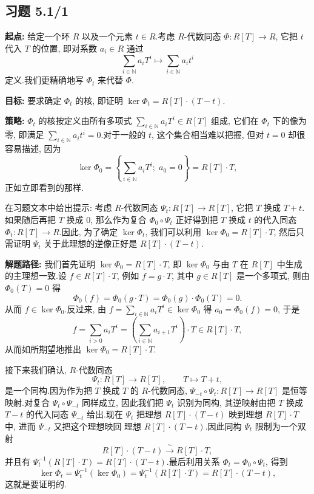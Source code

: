\subsection*{习题 5.1/1}

\noindent\textbf{起点:} 给定一个环 $R$ 以及一个元素 $t \in R$.考虑 $R$-代数同态
$\Phi \colon R[T] \longrightarrow R$, 它把 $t$ 代入 $T$ 的位置, 即对系数
$a_i \in R$ 通过
\[
\sum_{i \in \mathbb{N}} a_i T^i \longmapsto \sum_{i \in \mathbb{N}} a_i t^i
\]
定义.我们更精确地写 $\Phi_t$ 来代替 $\Phi$.

\noindent\textbf{目标:} 要求确定 $\Phi_t$ 的核, 即证明
$\ker \Phi_t = R[T] \cdot (T - t)$.

\noindent\textbf{策略:} $\Phi_t$ 的核按定义由所有多项式
$\sum_{i \in \mathbb{N}} a_i T^i \in R[T]$ 组成, 它们在 $\Phi_t$ 下的像为零, 即满足
$\sum_{i \in \mathbb{N}} a_i t^i = 0$.对于一般的 $t$, 这个集合相当难以把握, 但对
$t = 0$ 却很容易描述, 因为
\[
\ker \Phi_0 = \left\{ \sum_{i \in \mathbb{N}} a_i T^i;\; a_0 = 0 \right\} = R[T] \cdot T,
\]
正如立即看到的那样.

在习题文本中给出提示: 考虑 $R$-代数同态 $\Psi_t \colon R[T] \longrightarrow R[T]$,
它把 $T$ 换成 $T + t$.如果随后再把 $T$ 换成 $0$, 那么作为复合
$\Phi_0 \circ \Psi_t$ 正好得到把 $T$ 换成 $t$ 的代入同态
$\Phi_t \colon R[T] \longrightarrow R$.因此, 为了确定 $\ker \Phi_t$, 我们可以利用
$\ker \Phi_0 = R[T] \cdot T$, 然后只需证明 $\Psi_t$ 关于此理想的逆像正好是
$R[T] \cdot (T - t)$.

\noindent\textbf{解题路径:} 我们首先证明 $\ker \Phi_0 = R[T] \cdot T$, 即
$\ker \Phi_0$ 与由 $T$ 在 $R[T]$ 中生成的主理想一致.设 $f \in R[T] \cdot T$, 例如
$f = g \cdot T$, 其中 $g \in R[T]$ 是一个多项式, 则由 $\Phi_0(T) = 0$ 得
\[
\Phi_0(f) = \Phi_0(g \cdot T) = \Phi_0(g) \cdot \Phi_0(T) = 0\text{.}
\]
从而 $f \in \ker \Phi_0$.反过来, 由 $f = \sum_{i \in \mathbb{N}} a_i T^i \in \ker
\Phi_0$ 得 $a_0 = \Phi_0(f) = 0$, 于是
\[
f = \sum_{i > 0} a_i T^i = \left( \sum_{i \in \mathbb{N}} a_{i + 1} T^i \right) \cdot T \in R[T] \cdot T,
\]
从而如所期望地推出 $\ker \Phi_0 = R[T] \cdot T$.

接下来我们确认, $R$-代数同态
\[
\Psi_t \colon R[T] \longrightarrow R[T], \qquad T \longmapsto T + t,
\]
是一个同构.因为作为把 $T$ 换成 $T$ 的 $R$-代数同态,
$\Psi_{-t} \circ \Psi_t \colon R[T] \longrightarrow R[T]$ 是恒等映射.对复合
$\Psi_t \circ \Psi_{-t}$ 同样成立, 因此我们把 $\Psi_t$ 识别为同构, 其逆映射由把
$T$ 换成 $T - t$ 的代入同态 $\Psi_{-t}$ 给出.现在 $\Psi_t$ 把理想
$R[T] \cdot (T - t)$ 映到理想 $R[T] \cdot T$ 中, 进而 $\Psi_{-t}$ 又把这个理想映回
理想 $R[T] \cdot (T - t)$.因此同构 $\Psi_t$ 限制为一个双射
\[
R[T] \cdot (T - t) \xrightarrow{\ \sim\ } R[T] \cdot T,
\]
并且有 $\Psi_t^{-1}(R[T] \cdot T) = R[T] \cdot (T - t)$.最后利用关系
$\Phi_t = \Phi_0 \circ \Psi_t$, 得到
\[
\ker \Phi_t = \Psi_t^{-1}(\ker \Phi_0) = \Psi_t^{-1}(R[T] \cdot T) = R[T] \cdot (T - t),
\]
这就是要证明的.

